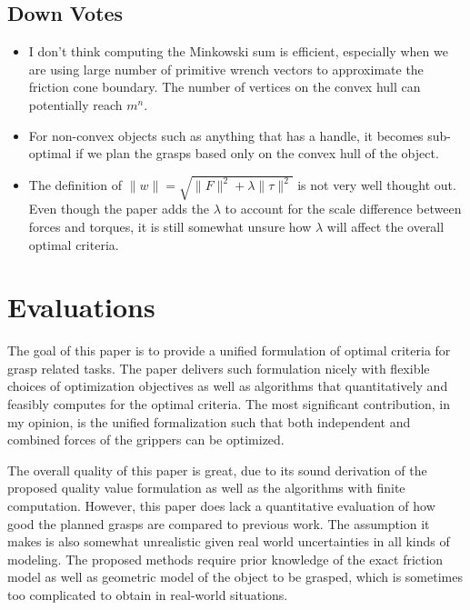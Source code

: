 \documentclass[10pt, twocolumn]{article}
\begin{document}
\subsection{Down Votes}
\begin{itemize}
    \item I don't think computing the Minkowski sum is efficient, especially
        when we are using large number of primitive wrench vectors to 
        approximate the friction cone boundary. The number of vertices on
        the convex hull can potentially reach $m^n$.
    \item For non-convex objects such as anything that has a handle, it
        becomes sub-optimal if we plan the grasps based only on the convex
        hull of the object.
    \item The definition of $\|w\| = \sqrt{\|F\|^2 + \lambda \|\tau\|^2}$
        is not very well thought out. Even though the paper adds the $\lambda$
        to account for the scale difference between forces and torques, 
        it is still somewhat unsure how $\lambda$ will affect the overall 
        optimal criteria.
\end{itemize}

\section{Evaluations}

The goal of this paper is to provide a unified formulation of optimal criteria
for grasp related tasks. The paper delivers such formulation nicely with
flexible choices of optimization objectives as well as algorithms that 
quantitatively and feasibly computes for the optimal criteria. The most significant
contribution, in my opinion, is the unified formalization such that both 
independent and combined forces of the grippers can be optimized.

The overall quality of this paper is great, due to its sound derivation of 
the proposed quality value formulation as well as the algorithms with finite
computation. However, this paper does lack a  quantitative evaluation of 
how good the planned grasps are compared to 
previous work. The assumption it makes is also somewhat unrealistic given
real world uncertainties in all kinds of modeling. The proposed methods require
prior knowledge of the exact friction model as well as geometric model of the 
object to be grasped, which is sometimes too complicated to obtain in
real-world situations.
\end{document}
